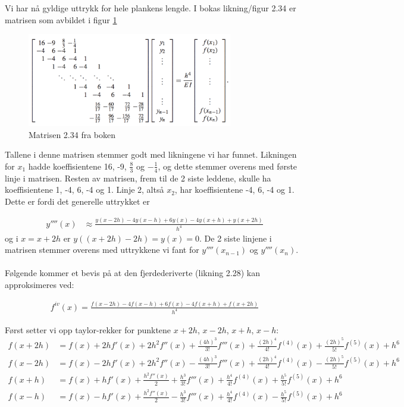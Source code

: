 Vi har nå gyldige uttrykk for hele plankens lengde. I bokas likning/figur 2.34 er matrisen som avbildet i figur \ref{fig:EBMatrix} 
\begin{figure}[h]
    \centering
    \includegraphics[width=0.8\textwidth]{sections/Theory/EBMatrix}
    \caption{Matrisen 2.34 fra boken}
    \label{fig:EBMatrix}
\end{figure}
Tallene i denne matrisen stemmer godt med likningene vi har funnet. Likningen for $x_1$ hadde koeffisientene 16, -9, $\frac{8}{3}$ og $-\frac{1}{4}$, og dette stemmer overens med første linje i matrisen. Resten av matrisen, frem til de 2 siste leddene, skulle ha koeffisientene 1, -4, 6, -4 og 1. Linje 2, altså $x_2$, har koeffisientene -4, 6, -4 og 1. Dette er fordi det generelle uttrykket er 

\begin{align}
    y''''(x)& \approx \frac{y(x-2h)-4y(x-h)+6y(x)-4y(x+h)+y(x+2h)}{h^4} \nonumber
\end{align}
og i $x=x+2h$ er $y((x+2h)-2h)=y(x)=0$. De 2 siste linjene i matrisen stemmer overens med uttrykkene vi fant for $y''''(x_{n-1})$ og $y''''(x_n)$. 
\\ \\
Følgende kommer et bevis på at den fjerdederiverte (likning 2.28) kan approksimeres ved: 

\begin{align}
    f^{iv}(x)=\frac{f(x-2h)-4f(x-h)+6f(x)-4f(x+h)+f(x+2h)}{h^4}\nonumber
\end{align}

Først setter vi opp taylor-rekker for punktene $x+2h$, $x-2h$, $x+h$, $x-h$: 
\begin{align}
    f(x+2h)&=f(x)+2hf'(x)+2h^2f''(x)+\frac{(4h)^3}{3!}f'''(x)+\frac{(2h)^4}{4!}f^{(4)}(x)+\frac{(2h)^5}{5!}f^{(5)}(x)+h^6\nonumber\\ 
    f(x-2h)&=f(x)-2hf'(x)+2h^2f''(x)-\frac{(4h)^3}{3!}f'''(x)+\frac{(2h)^4}{4!}f^{(4)}(x)-\frac{(2h)^5}{5!}f^{(5)}(x)+h^6\nonumber\\
    f(x+h)&=f(x)+hf'(x)+\frac{h^2f''(x)}{2}+\frac{h^3}{3!}f'''(x)+\frac{h^4}{4!}f^{(4)}(x)+\frac{h^5}{5!}f^{(5)}(x)+h^6\nonumber\\
    f(x-h)&=f(x)-hf'(x)+\frac{h^2f''(x)}{2}-\frac{h^3}{3!}f'''(x)+\frac{h^4}{4!}f^{(4)}(x)-\frac{h^5}{5!}f^{(5)}(x)+h^6\nonumber
\end{align}

